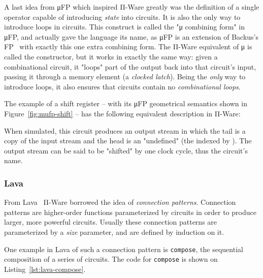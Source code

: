         A last idea from μFP which inspired Π-Ware greatly was the definition of a
        single operator capable of introducing \emph{state} into circuits.
        It is also the only way to introduce loops in circuits.
        This construct is called the "μ combining form" in μFP, and actually gave the language its name,
        as μFP is an extension of Backus's FP~\cite{backus-turing-lecture} with exactly this one
        extra combining form.
        The Π-Ware equivalent of μ is called the  constructor, but it works in exactly the same way:
        given a combinational circuit, it "loops" part of the output back into that circuit's input,
        passing it through a memory element (a \emph{clocked latch}).
        Being the \emph{only} way to introduce loops, it also ensures that circuits contain no
        \emph{combinational loops}.

        The example of a shift register – with its μFP geometrical semantics shown in
        Figure~\ref{fig:mufp-shift} – has the following equivalent description in Π-Ware:

        \begin{center}
        \end{center}

        When simulated, this circuit produces an output stream in which the tail is a copy of the
        input stream and the head is an "undefined"  (the  indexed by ).
        The output stream can be said to be "shifted" by one clock cycle, thus the circuit's name.

        \subsubsection{Lava}
        From Lava~\cite{observable-sharing-circuits} Π-Ware borrowed the idea of \emph{connection patterns}.
        Connection patterns are higher-order functions parameterized by circuits in order to produce
        larger, more powerful circuits.
        Usually these connection patterns are parameterized by a \emph{size} parameter,
        and are defined by induction on it.

        One example in Lava of such a connection pattern is \texttt{compose},
        the sequential composition of a series of circuits.
        The code for \texttt{compose} is shown on Listing~\ref{lst:lava-compose}.

